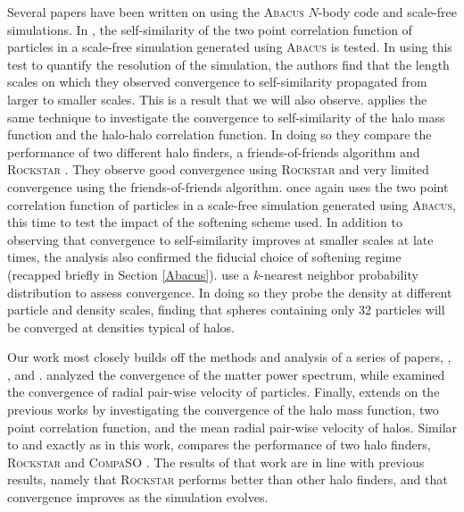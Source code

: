 Several papers have been written on using the \textsc{Abacus} $N$-body code and scale-free simulations. In \cite{Joyce_2021}, the self-similarity of the two point correlation function of particles in a scale-free simulation generated using \textsc{Abacus} is tested. In using this test to quantify the resolution of the simulation, the authors find that the length scales on which they observed convergence to self-similarity propagated from larger to smaller scales. This is a result that we will also observe. \cite{Leroy_2021} applies the same technique to investigate the convergence to self-similarity of the halo mass function and the halo-halo correlation function. In doing so they compare the performance of two different halo finders, a friends-of-friends algorithm and \textsc{Rockstar} \cite{Rockstar}. They observe good convergence using \textsc{Rockstar} and very limited convergence using the friends-of-friends algorithm. \cite{Garrison_2021_softening} once again uses the two point correlation function of particles in a scale-free simulation generated using \textsc{Abacus}, this time to test the impact of the softening scheme used. In addition to observing that convergence to self-similarity improves at smaller scales at late times, the analysis also confirmed the fiducial choice of softening regime (recapped briefly in Section \ref{Abacus}). \cite{Garrison_2022_k_nearest} use a $k$-nearest neighbor probability distribution to assess convergence. In doing so they probe the density at different particle and density scales, finding that spheres containing only 32 particles will be converged at densities typical of halos. 

Our work most closely builds off the methods and analysis of a series of papers, \cite{Maleubre_2022}, \cite{Maleubre_2023}, and \cite{Maleubre_2024}. \cite{Maleubre_2022} analyzed the convergence of the matter power spectrum, while \cite{Maleubre_2023} examined the convergence of radial pair-wise velocity of particles. Finally, \cite{Maleubre_2024} extends on the previous works by investigating the convergence of the halo mass function, two point correlation function, and the mean radial pair-wise velocity of halos. Similar to \cite{Leroy_2021} and exactly as in this work, \cite{Maleubre_2024} compares the performance of two halo finders, \textsc{Rockstar} \cite{Rockstar} and \textsc{CompaSO} \cite{CompaSO}. The results of that work are in line with previous results, namely that \textsc{Rockstar} performs better than other halo finders, and that convergence improves as the simulation evolves. 

